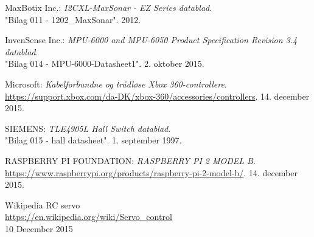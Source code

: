 \begin{thebibliography}{2}
 MaxBotix Inc.: \textit{I2CXL-MaxSonar - EZ Series datablad}. \\
"Bilag 011 - 1202\_MaxSonar". 2012.

 InvenSense Inc.: \textit{MPU-6000 and MPU-6050 Product Specification Revision 3.4 datablad}. \\
"Bilag 014 - MPU-6000-Datasheet1". 2. oktober 2015.

 Microsoft: \textit{Kabelforbundne og trådløse Xbox 360-controllere}. \\
\url{https://support.xbox.com/da-DK/xbox-360/accessories/controllers}. 14. december 2015.

 SIEMENS: \textit{TLE4905L Hall Switch datablad}. \\
"Bilag 015 - hall datasheet". 1. september 1997.

 RASPBERRY PI FOUNDATION: \textit{RASPBERRY PI 2 MODEL B}. \\
\url{https://www.raspberrypi.org/products/raspberry-pi-2-model-b/}. 14. december 2015.

 Wikipedia RC servo \\
\url{https://en.wikipedia.org/wiki/Servo_control}\\
10 December 2015

\end{thebibliography}